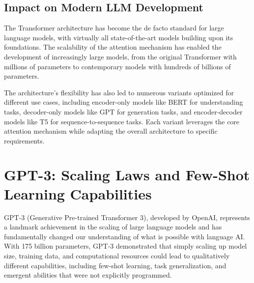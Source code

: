 \subsection{Impact on Modern LLM Development}

The Transformer architecture has become the de facto standard for large language models, with virtually all state-of-the-art models building upon its foundations. The scalability of the attention mechanism has enabled the development of increasingly large models, from the original Transformer with millions of parameters to contemporary models with hundreds of billions of parameters.


The architecture's flexibility has also led to numerous variants optimized for different use cases, including encoder-only models like BERT for understanding tasks, decoder-only models like GPT for generation tasks, and encoder-decoder models like T5 for sequence-to-sequence tasks. Each variant leverages the core attention mechanism while adapting the overall architecture to specific requirements.


\section{GPT-3: Scaling Laws and Few-Shot Learning Capabilities}

GPT-3 (Generative Pre-trained Transformer 3), developed by OpenAI, represents a landmark achievement in the scaling of large language models and has fundamentally changed our understanding of what is possible with language AI. With 175 billion parameters, GPT-3 demonstrated that simply scaling up model size, training data, and computational resources could lead to qualitatively different capabilities, including few-shot learning, task generalization, and emergent abilities that were not explicitly programmed.

